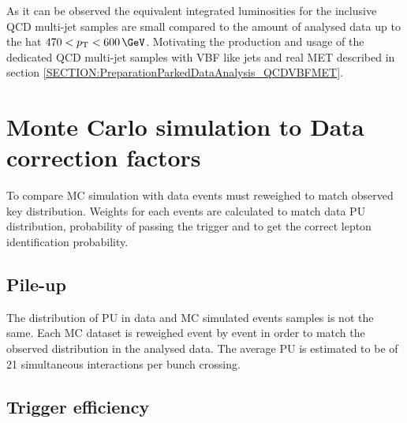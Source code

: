 As it can be observed the equivalent integrated luminosities for the inclusive \gls{QCD} multi-jet samples are small compared to the amount of analysed data up to the \pt hat $470<\pt<600\,\GeV$. Motivating the production and usage of the dedicated \gls{QCD} multi-jet samples with \gls{VBF} like jets and real \gls{MET} described in section \ref{SECTION:PreparationParkedDataAnalysis_QCDVBFMET}.

\clearpage

\section{Monte Carlo simulation to Data correction factors}


To compare \gls{MC} simulation with data events must reweighed to match observed key distribution. Weights for each events are calculated to match data \gls{PU} distribution, probability of passing the trigger and to get the correct lepton identification probability.

\subsection{Pile-up}


The distribution of \gls{PU} in data and \gls{MC} simulated events samples is not the same. Each \gls{MC} dataset is reweighed event by event in order to match the observed distribution in the analysed data. The average \gls{PU} is estimated to be of 21 simultaneous interactions per bunch crossing. 

\subsection{Trigger efficiency}
\label{SUBSECTION:ParkedDataAnalysis_CorrectionFactors_TriggerEfficiency}

